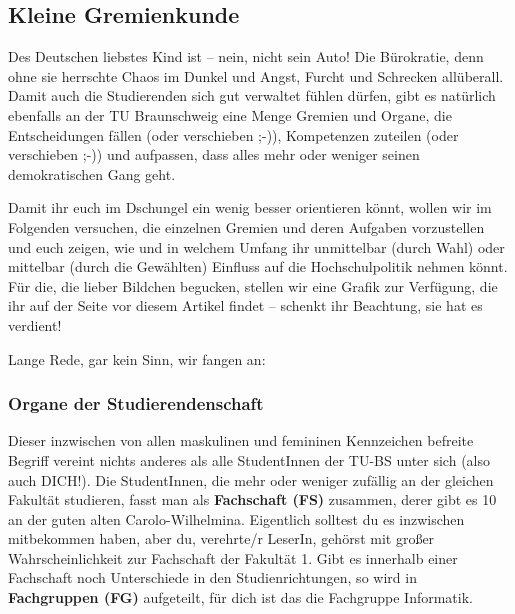 \subsection{Kleine Gremienkunde}
	Des Deutschen liebstes Kind ist -- nein, nicht sein Auto! Die Bürokratie, denn ohne sie herrschte Chaos im Dunkel und Angst, Furcht und Schrecken allüberall. Damit auch die Studierenden sich gut verwaltet fühlen dürfen, gibt es natürlich ebenfalls an der TU Braunschweig eine Menge Gremien und Organe, die Entscheidungen fällen (oder verschieben ;-)), Kompetenzen zuteilen (oder verschieben ;-)) und aufpassen, dass alles mehr oder weniger seinen demokratischen Gang geht.

	Damit ihr euch im Dschungel ein wenig besser orientieren könnt, wollen wir im Folgenden versuchen, die einzelnen Gremien und deren Aufgaben vorzustellen und euch zeigen, wie und in welchem Umfang ihr unmittelbar (durch Wahl) oder mittelbar (durch die Gewählten) Einfluss auf die Hochschulpolitik nehmen könnt. Für die, die lieber Bildchen begucken, stellen wir eine Grafik zur Verfügung, die ihr auf der Seite vor diesem Artikel findet -- schenkt ihr Beachtung, sie hat es verdient!

	Lange Rede, gar kein Sinn, wir fangen an:

	\subsubsection*{Organe der Studierendenschaft}
		Dieser inzwischen von allen maskulinen und femininen Kennzeichen befreite Begriff vereint nichts anderes als alle StudentInnen der TU-BS unter sich (also auch DICH!). Die StudentInnen, die mehr oder weniger zufällig an der gleichen Fakultät studieren, fasst man als \textbf{Fachschaft (FS)} zusammen, derer gibt es 10 an der guten alten Carolo-Wilhelmina. Eigentlich solltest du es inzwischen mitbekommen haben, aber du, verehrte/r LeserIn, gehörst mit großer Wahrscheinlichkeit zur Fachschaft der Fakultät 1. Gibt es innerhalb einer Fachschaft noch Unterschiede in den Studienrichtungen, so wird in \textbf{Fachgruppen (FG)} aufgeteilt, für dich ist das die Fachgruppe Informatik.

